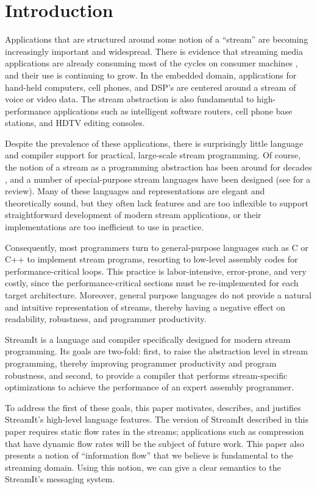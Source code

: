 \section{Introduction}

Applications that are structured around some notion of a ``stream''
are becoming increasingly important and widespread.  There is evidence
that streaming media applications are already consuming most of the
cycles on consumer machines \cite{Rix98}, and their use is continuing
to grow.  In the embedded domain, applications for hand-held
computers, cell phones, and DSP's are centered around a stream of
voice or video data.  The stream abstraction is also fundamental to
high-performance applications such as intelligent software routers,
cell phone base stations, and HDTV editing consoles.

Despite the prevalence of these applications, there is surprisingly
little language and compiler support for practical, large-scale stream
programming.  Of course, the notion of a stream as a programming
abstraction has been around for decades \cite{SICP}, and a number of
special-purpose stream languages have been designed (see
\cite{survey97} for a review).  Many of these languages and
representations are elegant and theoretically sound, but they often
lack features and are too inflexible to support straightforward
development of modern stream applications, or their implementations
are too inefficient to use in practice.

Consequently, most programmers turn to general-purpose languages such
as C or C++ to implement stream programs, resorting to low-level
assembly codes for performance-critical loops.  This practice is
labor-intensive, error-prone, and very costly, since the
performance-critical sections must be re-implemented for each target
architecture.  Moreover, general purpose languages do not provide a
natural and intuitive representation of streams, thereby having a
negative effect on readability, robustness, and programmer
productivity.

StreamIt is a language and compiler specifically designed for modern
stream programming.  Its goals are two-fold: first, to raise the
abstraction level in stream programming, thereby improving programmer
productivity and program robustness, and second, to provide a compiler
that performs stream-specific optimizations to achieve the performance
of an expert assembly programmer.  

To address the first of these goals, this paper motivates, describes,
and justifies StreamIt's high-level language features.  The version of
StreamIt described in this paper requires static flow rates in the
streams; applications such as compression that have dynamic flow rates
will be the subject of future work.  This paper also presents a notion
of ``information flow'' that we believe is fundamental to the
streaming domain.  Using this notion, we can give a clear semantics to
the StreamIt's messaging system.

